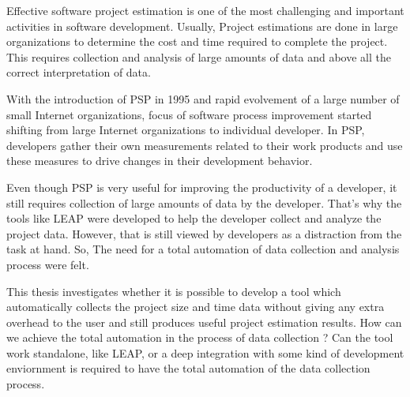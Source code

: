 
\uppercase{\abstractname}{

Effective software project estimation is one of the most challenging and 
important activities in software development. Usually, Project estimations are
done in large organizations to determine the cost and time required to complete
the project. This requires collection and analysis of large amounts of data and
above all the correct interpretation of data.

With the introduction of PSP in 1995 and rapid evolvement of a large number of
small Internet organizations, focus of software process improvement started 
shifting from large Internet organizations to individual developer. In PSP, 
developers gather their own measurements related to their work products and 
use these measures to drive changes in their development behavior.

Even though PSP is very useful for improving the productivity of a developer, 
it still requires collection of large amounts of data by the developer. That's
why the tools like LEAP were developed to help the developer collect and 
analyze the project data. However, that is still viewed by developers as a 
distraction from the task at hand. So, The need for a total automation of data
collection and analysis process were felt.

This thesis investigates whether it is possible to develop a tool which 
automatically collects the project size and time data without giving any extra
overhead to the user and still produces useful project estimation results. How
can we achieve the total automation in the process of data collection ? Can 
the tool work standalone, like LEAP, or a deep integration with some kind 
of development enviornment is required to have the total automation of the data
collection process.

}



